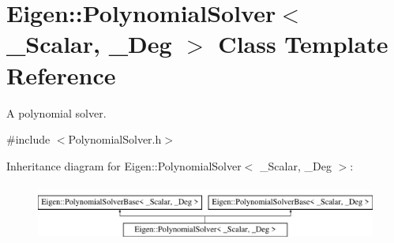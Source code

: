 \hypertarget{class_eigen_1_1_polynomial_solver}{}\section{Eigen\+:\+:Polynomial\+Solver$<$ \+\_\+\+Scalar, \+\_\+\+Deg $>$ Class Template Reference}
\label{class_eigen_1_1_polynomial_solver}


A polynomial solver.  




{\ttfamily \#include $<$Polynomial\+Solver.\+h$>$}

Inheritance diagram for Eigen\+:\+:Polynomial\+Solver$<$ \+\_\+\+Scalar, \+\_\+\+Deg $>$\+:\begin{figure}[H]
\begin{center}
\leavevmode
\includegraphics[height=1.924399cm]{class_eigen_1_1_polynomial_solver}
\end{center}
\end{figure}
